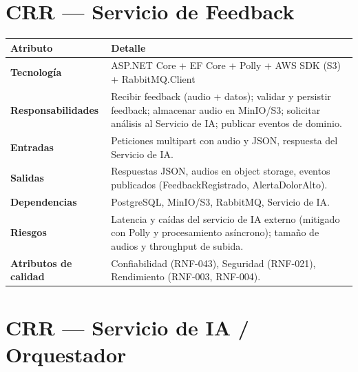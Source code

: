 \section{CRR --- Servicio de Feedback}

\begin{tabularx}{\textwidth}{>{\bfseries}L{3.5cm} X}
  \toprule
  \textbf{\color{fmAccent}Atributo} & \textbf{\color{fmAccent}Detalle} \\
  \midrule
  Tecnología & ASP.NET Core + EF Core + Polly + AWS SDK (S3) + RabbitMQ.Client \\
  Responsabilidades & Recibir feedback (audio + datos); validar y persistir feedback; almacenar audio en MinIO/S3; solicitar análisis al Servicio de IA; publicar eventos de dominio. \\
  Entradas & Peticiones multipart con audio y JSON, respuesta del Servicio de IA. \\
  Salidas & Respuestas JSON, audios en object storage, eventos publicados (FeedbackRegistrado, AlertaDolorAlto). \\
  Dependencias & PostgreSQL, MinIO/S3, RabbitMQ, Servicio de IA. \\
  Riesgos & Latencia y caídas del servicio de IA externo (mitigado con Polly y procesamiento asíncrono); tamaño de audios y throughput de subida. \\
  Atributos de calidad & Confiabilidad (RNF-043), Seguridad (RNF-021), Rendimiento (RNF-003, RNF-004). \\
  \bottomrule
\end{tabularx}

\section{CRR --- Servicio de IA / Orquestador}

